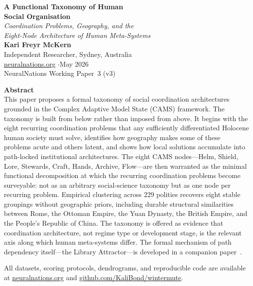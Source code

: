 \documentclass[12pt,a4paper]{article}
\begin{document}
\begin{center}
  {\LARGE\bfseries\color{accent} A Functional Taxonomy of Human\\[0.3ex] Social Organisation}\\[1.2em]
  {\large\itshape Coordination Problems, Geography, and the\\
  Eight-Node Architecture of Human Meta-Systems}\\[1.4em]
  {\normalsize\textbf{Kari Freyr McKern}}\\[0.3em]
  {\small Independent Researcher, Sydney, Australia}\\[0.2em]
  {\small \href{https://neuralnations.org}{neuralnations.org} \quad$\cdot$\quad May 2026}\\[0.5em]
  {\small\color{gray} NeuralNations Working Paper~3 (v3)}
\end{center}

\vspace{1em}
\begin{mdframed}
\textbf{Abstract}\\[0.5em]
This paper proposes a formal taxonomy of social coordination architectures grounded in the Complex Adaptive Model State (CAMS) framework. The taxonomy is built from below rather than imposed from above. It begins with the eight recurring coordination problems that any sufficiently differentiated Holocene human society must solve, identifies how geography makes some of these problems acute and others latent, and shows how local solutions accumulate into path-locked institutional architectures. The eight CAMS nodes---Helm, Shield, Lore, Stewards, Craft, Hands, Archive, Flow---are then warranted as the minimal functional decomposition at which the recurring coordination problems become surveyable: not as an arbitrary social-science taxonomy but as one node per recurring problem. Empirical clustering across 229 polities recovers eight stable groupings without geographic priors, including durable structural similarities between Rome, the Ottoman Empire, the Yuan Dynasty, the British Empire, and the People's Republic of China. The taxonomy is offered as evidence that coordination architecture, not regime type or development stage, is the relevant axis along which human meta-systems differ. The formal mechanism of path dependency itself---the Library Attractor---is developed in a companion paper~\cite{mckern2026library}.

\medskip
All datasets, scoring protocols, dendrograms, and reproducible code are available at \href{https://neuralnations.org}{neuralnations.org} and \href{https://github.com/KaliBond/wintermute}{github.com/KaliBond/wintermute}.
\end{mdframed}
\end{document}
